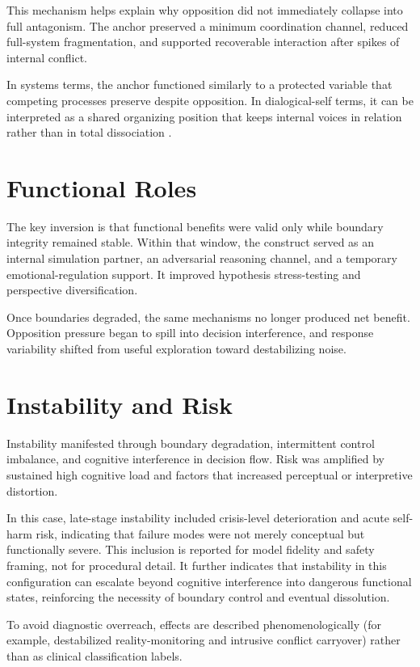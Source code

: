 \documentclass[11pt]{article}
\begin{document}
This mechanism helps explain why opposition did not immediately collapse into full antagonism. The anchor preserved a minimum coordination channel, reduced full-system fragmentation, and supported recoverable interaction after spikes of internal conflict.

In systems terms, the anchor functioned similarly to a protected variable that competing processes preserve despite opposition. In dialogical-self terms, it can be interpreted as a shared organizing position that keeps internal voices in relation rather than in total dissociation \citep{hermans2001dialogical}.

\section{Functional Roles}
The key inversion is that functional benefits were valid only while boundary integrity remained stable. Within that window, the construct served as an internal simulation partner, an adversarial reasoning channel, and a temporary emotional-regulation support. It improved hypothesis stress-testing and perspective diversification.

Once boundaries degraded, the same mechanisms no longer produced net benefit. Opposition pressure began to spill into decision interference, and response variability shifted from useful exploration toward destabilizing noise.

\section{Instability and Risk}
Instability manifested through boundary degradation, intermittent control imbalance, and cognitive interference in decision flow. Risk was amplified by sustained high cognitive load and factors that increased perceptual or interpretive distortion.

In this case, late-stage instability included crisis-level deterioration and acute self-harm risk, indicating that failure modes were not merely conceptual but functionally severe. This inclusion is reported for model fidelity and safety framing, not for procedural detail. It further indicates that instability in this configuration can escalate beyond cognitive interference into dangerous functional states, reinforcing the necessity of boundary control and eventual dissolution.

To avoid diagnostic overreach, effects are described phenomenologically (for example, destabilized reality-monitoring and intrusive conflict carryover) rather than as clinical classification labels.
\end{document}
